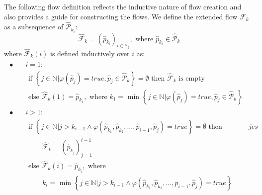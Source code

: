 The following flow definition reflects the inductive nature of flow creation and also provides a guide for constructing the flows. We define the extended flow $\mathcal{F}_k$ as a subsequence of $\widehat{\mathcal{P}}_{k_i}$:
\begin{equation}
\widehat{\mathcal{F}}_k = (\widehat{p}_{k_i})_{i \in \mathbb{S}_k}, \mbox{ where } \widehat{p}_{k_i} \in \widehat{\mathcal{P}}_k
\end{equation}
where $\widehat{\mathcal{F}}_k(i)$ is defined inductively over $i$ as:
\begin{align}
\begin{split}
\bullet\quad &i = 1: \\
	&\begin{array}{l}
		\mbox{if } \left\{ j \in \mathbb{N} | \varphi(\widehat{p}_j) = true, \widehat{p}_j \in \widehat{\mathcal{P}}_k \right\} = \emptyset \mbox{ then } \widehat{\mathcal{F}}_k \mbox{ is empty} \\
		\mbox{else } \widehat{\mathcal{F}}_k(1) = \widehat{p}_{k_1}, \mbox{ where } k_1 = \mbox{ min }\left\{ j \in \mathbb{N} | \varphi(\widehat{p}_j) = true, \widehat{p}_j \in \widehat{\mathcal{P}}_k \right\}
	\end{array}\\
\bullet\quad &i > 1: \\
	&\begin{array}{l}
		\mbox{if } \left\{ j \in \mathbb{N} | j > k_{i-1} \land \varphi(\widehat{p}_{k_1}, \widehat{p}_{k_2}, \ldots, \widehat{p}_{i-1}, \widehat{p}_j) = true \right\} = \emptyset \mbox{ then } \\
		\qquad \widehat{\mathcal{F}}_k = (\widehat{p}_{k_j})_{j=1}^{i-1} \\
		\mbox{else } \widehat{\mathcal{F}}_k(i) = \widehat{p}_{k_i}, \mbox{ where } \\
		\qquad k_i = \mbox{ min }\left\{ j \in \mathbb{N} | j > k_{i-1} \land \varphi(\widehat{p}_{k_1}, \widehat{p}_{k_2}, \ldots, \widehat{p}_{i-1}, \widehat{p}_j) = true \right\}
	\end{array}
\end{split}
jes\end{align}

